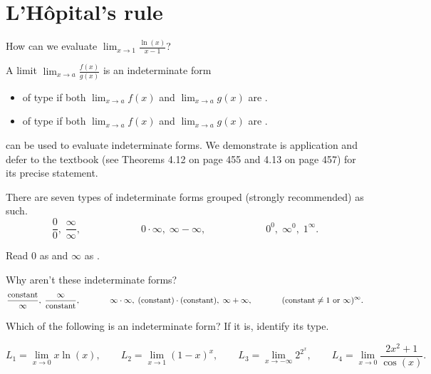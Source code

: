 \documentclass[../main.tex]{subfiles}
\begin{document}
 \section{L'H\^opital's rule}
How can we evaluate \(\lim_{x \to 1} \frac{\ln(x)}{x - 1}\)?


A limit \(\lim_{x \to a} \frac{f(x)}{g(x)}\) is an indeterminate form 
\begin{itemize}
  \item of type \underline{\hspace{1in}} if both \(\lim_{x \to a} f(x)\) and \(\lim_{x \to a} g(x)\) are \underline{\hspace{1in}}.
  \item of type \underline{\hspace{1in}} if both \(\lim_{x \to a} f(x)\) and \(\lim_{x \to a} g(x)\) are \underline{\hspace{1in}}.
\end{itemize}
 can be used to evaluate indeterminate forms. We demonstrate is application and defer to the textbook (see Theorems 4.12 on page 455 and 4.13 on page 457) for its precise statement.

There are seven types of indeterminate forms grouped (strongly recommended) as such. 
\[
  \frac{0}{0},\; \frac{\infty}{\infty}, \hspace{1in} 0 \cdot \infty,\; \infty - \infty, \hspace{1in} 0^{0}, \; \infty^{0}, \; 1^{\infty}.
\]


Read \(0\) as \underline{\hspace{2in}} and \(\infty\) as \underline{\hspace{2in}}. 


Why aren't these indeterminate forms?
\[
  \frac{\text{constant}}{\infty},\; \frac{\infty}{\text{constant}}, \hspace{0.5in} \infty \cdot \infty,\; (\text{constant}) \cdot (\text{constant}),\; \infty + \infty, \hspace{0.5in} (\text{constant} \ne 1 \text{ or } \infty)^{\infty}.
\]


\begin{example}
  Which of the following is an indeterminate form? If it is, identify its type. 

  \[
    L_{1} = \lim_{x \to 0} x \ln(x),
    \qquad
    L_{2} = \lim_{x \to 1} (1-x)^{x},
    \qquad
    L_{3} = \lim_{x \to -\infty} 2^{2^{x}},
    \qquad
    L_{4} = \lim_{x \to 0} \frac{2x^{2}+1}{\cos(x)}.
  \]

\end{example}
\clearpage
\end{document}
